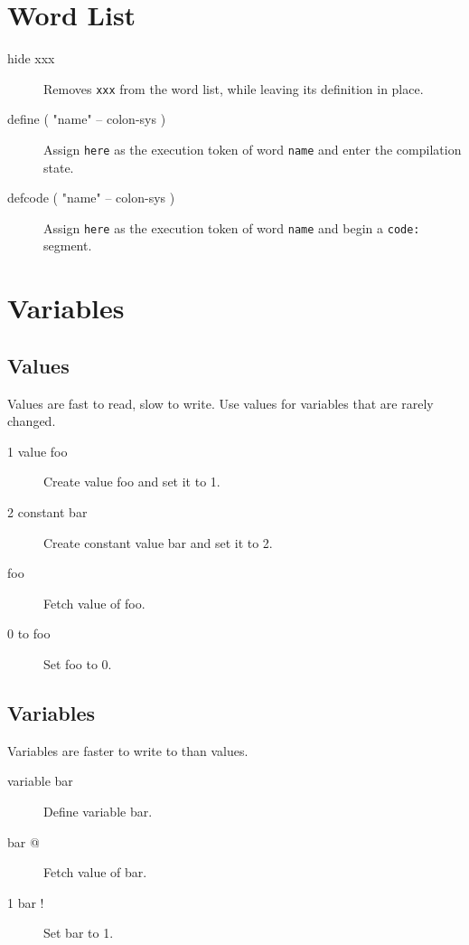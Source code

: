 \section{Word List}

\begin{description}

\item[hide xxx] Removes \texttt{xxx} from the word list, while leaving its definition in place.
\item[define ( "name" -- colon-sys ) ] Assign \texttt{here} as the execution token of word \texttt{name} and enter the compilation state.
\item[defcode ( "name" -- colon-sys ) ] Assign \texttt{here} as the execution token of word \texttt{name} and begin a \texttt{code:} segment.

\end{description}

\section{Variables}

\subsection{Values}

Values are fast to read, slow to write. Use values for variables
that are rarely changed.

\begin{description}
\item[1 value foo] Create value foo and set it to 1.
\item[2 constant bar] Create constant value bar and set it to 2.
\item[foo] Fetch value of foo.
\item[0 to foo] Set foo to 0.
\end{description}

\subsection{Variables}

Variables are faster to write to than values.

\begin{description}
\item[variable bar] Define variable bar.
\item[bar @] Fetch value of bar.
\item[1 bar !] Set bar to 1.
\end{description}

